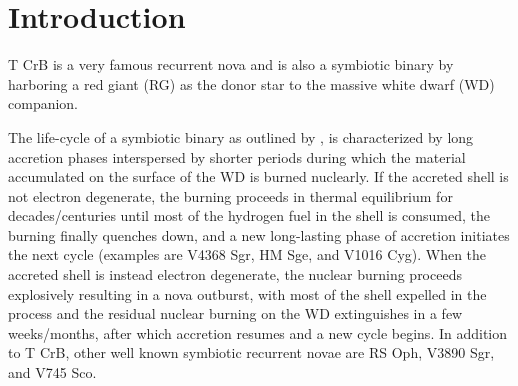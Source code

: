 \documentclass{aastex631}
\begin{document}

\section{Introduction} \label{sec:intro}

T CrB is a very famous recurrent nova \citep[eruptions recorded in 1866 and
1946;][and references therein]{1964gano.book.....P} and is also a
symbiotic binary by harboring a red giant (RG) as the donor star to the
massive white dwarf (WD) companion.

The life-cycle of a symbiotic binary as outlined by
\citet{2019arXiv190901389M}, is characterized by long accretion phases
interspersed by shorter periods during which the material accumulated on the
surface of the WD is burned nuclearly.  If the accreted shell is not
electron degenerate, the burning proceeds in thermal equilibrium for
decades/centuries until most of the hydrogen fuel in the shell is consumed,
the burning finally quenches down, and a new long-lasting phase of accretion
initiates the next cycle (examples are V4368 Sgr, HM Sge, and V1016 Cyg). 
When the accreted shell is instead electron degenerate, the nuclear burning
proceeds explosively resulting in a nova outburst, with most of the shell
expelled in the process and the residual nuclear burning on the WD extinguishes in a
few weeks/months, after which accretion resumes and a new cycle begins.  In
addition to T CrB, other well known symbiotic recurrent novae are RS Oph,
V3890 Sgr, and V745 Sco.
\end{document}
